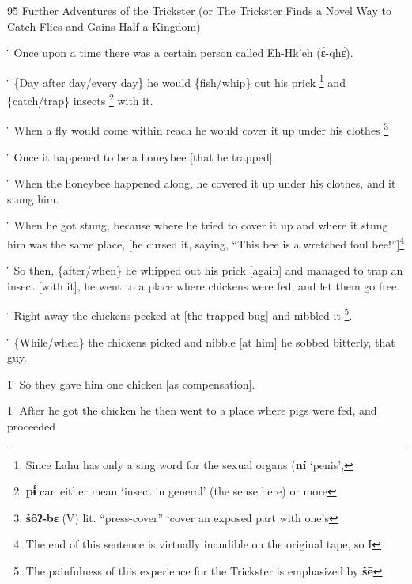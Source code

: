 
95 Further Adventures of the Trickster (or The Trickster Finds a Novel Way to Catch
Flies and Gains Half a Kingdom)

\. Once upon a time there was a certain person called Eh-Hk'eh (ɛ̀-qhɛ̀).

\. \{Day after day/every day\} he would \{fish/whip\} out his prick \footnote{Since Lahu has only a sing word for the sexual organs (\textbf{ní }`penis',} and \{catch/trap\}
insects \footnote{\textbf{pɨ́ }can either mean `insect in general' (the sense here) or more} with it.

\. When a fly would come within reach he would cover it up under his clothes \footnote{\textbf{šôʔ-bɛ} (V) lit. ``press-cover'' `cover an exposed part with one's}

\. Once it happened to be a honeybee [that he trapped].

\. When the honeybee happened along, he covered it up under his clothes, and it
stung him.

\. When he got stung, because where he tried to cover it up and where it stung
him was the same place, [he cursed it, saying, ``This bee is a wretched foul bee!'']\footnote{The end of this sentence is virtually inaudible on the original tape, so I}

\. So then, \{after/when\} he whipped out his prick [again] and managed to trap
an insect [with it], he went to a place where chickens were fed, and let them go
free.

\. Right away the chickens pecked at [the trapped bug] and nibbled it \footnote{The painfulness of this experience for the Trickster is emphasized by \textbf{šē}}.

\. \{While/when\} the chickens picked and nibble [at him] he sobbed bitterly, that
guy.

1\. So they gave him one chicken [as compensation].

1\. After he got the chicken he then went to a place where pigs were fed, and proceeded
